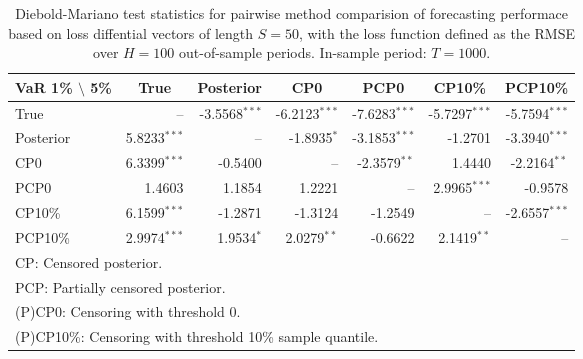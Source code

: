 { \renewcommand{\arraystretch}{1.2} 
\begin{table}[!ht] 
\center 
\begin{tabular}{l | rrr rrr} 
VaR 1\% $\setminus$ 5\% & \multicolumn{1}{c}{True} & \multicolumn{1}{c}{Posterior} & \multicolumn{1}{c}{CP0} & \multicolumn{1}{c}{PCP0} & \multicolumn{1}{c}{CP10\%} & \multicolumn{1}{c}{PCP10\%} \\ \hline 
True &    --\phantom{$^{***}$} & -3.5568$^{***}$ & -6.2123$^{***}$ & -7.6283$^{***}$ & -5.7297$^{***}$ & -5.7594$^{***}$  \\ 
Posterior & 5.8233$^{***}$ &    --\phantom{$^{***}$} & -1.8935$^{*}$\phantom{$^{**}$} & -3.1853$^{***}$ & -1.2701\phantom{$^{***}$} & -3.3940$^{***}$  \\ 
CP0 & 6.3399$^{***}$ & -0.5400\phantom{$^{***}$} &    --\phantom{$^{***}$} & -2.3579$^{**}$\phantom{$^{*}$} & 1.4440\phantom{$^{***}$} & -2.2164$^{**}$\phantom{$^{*}$}  \\ 
PCP0 & 1.4603\phantom{$^{***}$} & 1.1854\phantom{$^{***}$} & 1.2221\phantom{$^{***}$} &    --\phantom{$^{***}$} & 2.9965$^{***}$ & -0.9578\phantom{$^{***}$}  \\ 
CP10\% & 6.1599$^{***}$ & -1.2871\phantom{$^{***}$} & -1.3124\phantom{$^{***}$} & -1.2549\phantom{$^{***}$} &    --\phantom{$^{***}$} & -2.6557$^{***}$  \\ 
PCP10\% & 2.9974$^{***}$ & 1.9534$^{*}$\phantom{$^{**}$} & 2.0279$^{**}$\phantom{$^{*}$} & -0.6622\phantom{$^{***}$} & 2.1419$^{**}$\phantom{$^{*}$} &    --\phantom{$^{***}$}  \\ 
\hline 
\multicolumn{7}{l}{\footnotesize{CP: Censored posterior.}}  \\ 
\multicolumn{7}{l}{\footnotesize{PCP: Partially censored posterior.}} \\ 
\multicolumn{7}{l}{\footnotesize{(P)CP0: Censoring with threshold 0.}} \\ 
\multicolumn{7}{l}{\footnotesize{(P)CP10\%: Censoring with threshold 10\% sample quantile.}}  \\ 
\end{tabular}
 \caption{Diebold-Mariano test statistics for  pairwise method comparision of forecasting performace based on loss diffential vectors of length $S = 50$, with the loss function defined as the RMSE over $H=100$ out-of-sample periods. In-sample period: $T = 1000$.} 
\label{tab:garch11_DM_T_1000}  
\end{table}
}